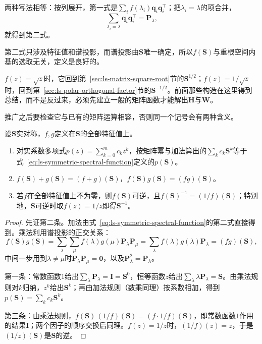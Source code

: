 两种写法相等：按列展开，第一式是$\sum_if(\lambda_i)\bm q_i\bm q_i^\top$；把$\lambda_i=\lambda$的项合并，
\[
 \sum_{\lambda_i=\lambda}\bm q_i\bm q_i^\top=\bm P_\lambda ,
\]
就得到第二式。

第二式只涉及特征值和谱投影，而谱投影由$\bm S$唯一确定，所以$f(\bm S)$与重根空间内基的选取无关，定义是良好的。

$f(z)=\sqrt z$时，它回到第~\ref{sec:ls-matrix-square-root}节的$\bm S^{1/2}$；$f(z)=1/\sqrt z$时，回到第~\ref{sec:ls-polar-orthogonal-factor}节的$\bm S^{-1/2}$。前面那些构造在这里得到总结，而不是反过来，必须先建立一般的矩阵函数才能解出$\bm H$与$\bm W$。

推广之后要检查它与已有的矩阵运算相容，否则同一个记号会有两种含义。

\begin{lemma}[谱函数与矩阵运算相容]
\label{lem:ls-spectral-function-calculus}
设$\bm S$实对称，$f,g$定义在$\bm S$的全部特征值上。
\begin{enumerate}
 \item 对实系数多项式$p(z)=\sum_{k=0}^mc_kz^k$，按矩阵幂与加法算出的$\sum_kc_k\bm S^k$等于式~\eqref{eq:ls-symmetric-spectral-function}定义的$p(\bm S)$。
 \item $f(\bm S)+g(\bm S)=(f+g)(\bm S)$，$f(\bm S)g(\bm S)=(fg)(\bm S)$。
 \item 若$f$在全部特征值上不为零，则$f(\bm S)$可逆，且$f(\bm S)^{-1}=(1/f)(\bm S)$；特别地，$\bm S$可逆时取$f(z)=1/z$即得$\bm S^{-1}$。
\end{enumerate}
\end{lemma}
\begin{proof}
先证第二条。加法由式~\eqref{eq:ls-symmetric-spectral-function}的第二式直接得到。乘法利用谱投影的正交关系：
\[
 f(\bm S)g(\bm S)
 =\sum_\lambda\sum_\mu f(\lambda)g(\mu)\bm P_\lambda\bm P_\mu
 =\sum_\lambda f(\lambda)g(\lambda)\bm P_\lambda
 =(fg)(\bm S),
\]
中间一步用到$\lambda\neq\mu$时$\bm P_\lambda\bm P_\mu=\bm0$，以及$\bm P_\lambda^2=\bm P_\lambda$。

第一条：常数函数$1$给出$\sum_\lambda\bm P_\lambda=\bm I=\bm S^0$，恒等函数$z$给出$\sum_\lambda\lambda\bm P_\lambda=\bm S$。由乘法规则对$k$归纳，$z^k$给出$\bm S^k$；再由加法规则（数乘同理）按系数相加，得到$p(\bm S)=\sum_kc_k\bm S^k$。

第三条：由乘法规则，$f(\bm S)\,(1/f)(\bm S)=(f\cdot 1/f)(\bm S)$，即常数函数$1$作用的结果$\bm I$；两个因子的顺序交换后同理。$f(z)=1/z$时，$(1/f)(z)=z$，于是$(1/z)(\bm S)$是$\bm S$的逆。
\end{proof}

